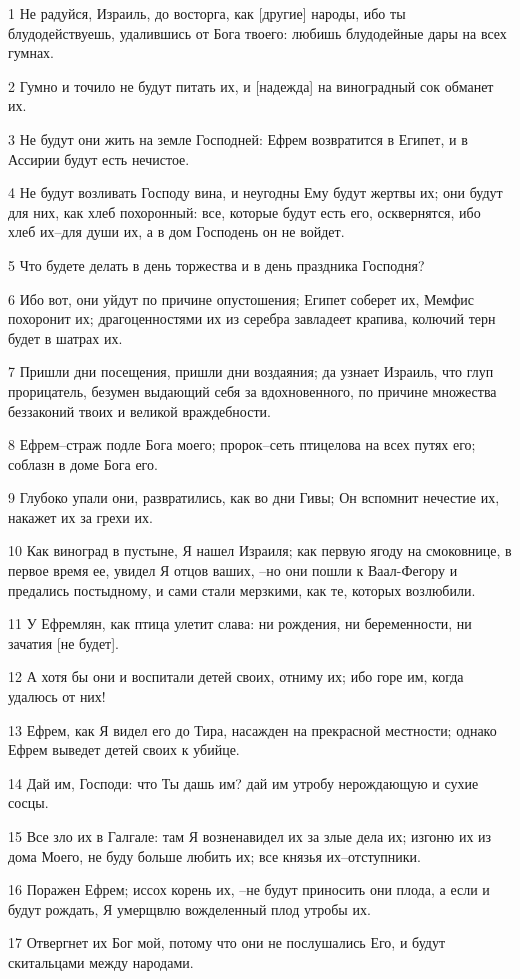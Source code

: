 \par 1 Не радуйся, Израиль, до восторга, как [другие] народы, ибо ты блудодействуешь, удалившись от Бога твоего: любишь блудодейные дары на всех гумнах.
\par 2 Гумно и точило не будут питать их, и [надежда] на виноградный сок обманет их.
\par 3 Не будут они жить на земле Господней: Ефрем возвратится в Египет, и в Ассирии будут есть нечистое.
\par 4 Не будут возливать Господу вина, и неугодны Ему будут жертвы их; они будут для них, как хлеб похоронный: все, которые будут есть его, осквернятся, ибо хлеб их--для души их, а в дом Господень он не войдет.
\par 5 Что будете делать в день торжества и в день праздника Господня?
\par 6 Ибо вот, они уйдут по причине опустошения; Египет соберет их, Мемфис похоронит их; драгоценностями их из серебра завладеет крапива, колючий терн будет в шатрах их.
\par 7 Пришли дни посещения, пришли дни воздаяния; да узнает Израиль, что глуп прорицатель, безумен выдающий себя за вдохновенного, по причине множества беззаконий твоих и великой враждебности.
\par 8 Ефрем--страж подле Бога моего; пророк--сеть птицелова на всех путях его; соблазн в доме Бога его.
\par 9 Глубоко упали они, развратились, как во дни Гивы; Он вспомнит нечестие их, накажет их за грехи их.
\par 10 Как виноград в пустыне, Я нашел Израиля; как первую ягоду на смоковнице, в первое время ее, увидел Я отцов ваших, --но они пошли к Ваал-Фегору и предались постыдному, и сами стали мерзкими, как те, которых возлюбили.
\par 11 У Ефремлян, как птица улетит слава: ни рождения, ни беременности, ни зачатия [не будет].
\par 12 А хотя бы они и воспитали детей своих, отниму их; ибо горе им, когда удалюсь от них!
\par 13 Ефрем, как Я видел его до Тира, насажден на прекрасной местности; однако Ефрем выведет детей своих к убийце.
\par 14 Дай им, Господи: что Ты дашь им? дай им утробу нерождающую и сухие сосцы.
\par 15 Все зло их в Галгале: там Я возненавидел их за злые дела их; изгоню их из дома Моего, не буду больше любить их; все князья их--отступники.
\par 16 Поражен Ефрем; иссох корень их, --не будут приносить они плода, а если и будут рождать, Я умерщвлю вожделенный плод утробы их.
\par 17 Отвергнет их Бог мой, потому что они не послушались Его, и будут скитальцами между народами.


